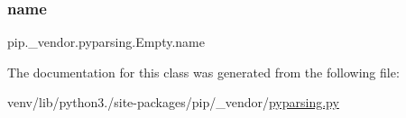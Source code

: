 \subsubsection{\texorpdfstring{name}{name}}
{\footnotesize\ttfamily pip.\+\_\+vendor.\+pyparsing.\+Empty.\+name}



The documentation for this class was generated from the following file\+:\begin{DoxyCompactItemize}
\item 
venv/lib/python3./site-\/packages/pip/\+\_\+vendor/\hyperlink{pip_2__vendor_2pyparsing_8py}{pyparsing.\+py}\end{DoxyCompactItemize}
